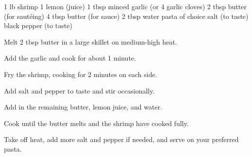\dishtype{\main}
\dishother{}
\begin{ingreds}
    1 lb shrimp
    1 lemon (juice)
    1 tbsp minced garlic (or 4 garlic cloves)
    2 tbsp butter (for saut\'eing)
    4 tbsp butter (for sauce)
    2 tbsp water
    pasta of choice
    salt (to taste)
    black pepper (to taste)    
\end{ingreds}
\begin{method}
    Melt 2 tbsp butter in a large skillet on medium-high heat.\par
    Add the garlic and cook for about 1 minute.\par
    Fry the shrimp, cooking for 2 minutes on each side.\par
    Add salt and pepper to taste and stir occasionally.\par
    Add in the remaining butter, lemon juice, and water.\par
    Cook until the butter melts and the shrimp have cooked fully.\par
    Take off heat, add more salt and pepper if needed, and serve on your preferred pasta.
\end{method}